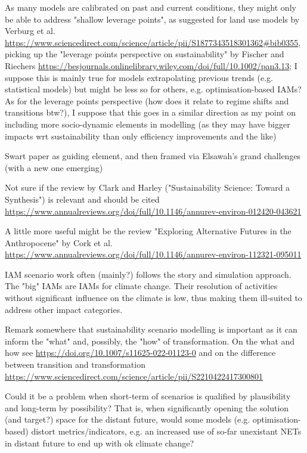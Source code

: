 \documentclass{article}
\begin{document}
As many models are calibrated on past and current conditions, they might only be able to address "shallow leverage points", as suggested for land use models by Verburg et al. \url{https://www.sciencedirect.com/science/article/pii/S1877343518301362#bib0355}, picking up the "leverage points perspective on sustainability" by Fischer and Riechers \url{https://besjournals.onlinelibrary.wiley.com/doi/full/10.1002/pan3.13}; I suppose this is mainly true for models extrapolating previous trends (e.g. statistical models) but might be less so for others, e.g. optimisation-based IAMs? As for the leverage points perspective (how does it relate to regime shifts and transitions btw?), I suppose that this goes in a similar direction as my point on including more socio-dynamic elements in modelling (as they may have bigger impacts wrt sustainability than only efficiency improvements and the like)

Swart paper as guiding element, and then framed via Elsawah's grand challenges (with a new one emerging)

Not sure if the review by Clark and Harley ("Sustainability Science: Toward a Synthesis") is relevant and should be cited \url{https://www.annualreviews.org/doi/full/10.1146/annurev-environ-012420-043621}

A little more useful might be the review "Exploring Alternative Futures in the Anthropocene" by Cork et al. \url{https://www.annualreviews.org/doi/full/10.1146/annurev-environ-112321-095011}

IAM scenario work often (mainly?) follows the story and simulation approach.
The "big" IAMs are IAMs for climate change. Their resolution of activities without significant influence on the climate is low, thus making them ill-suited to address other impact categories.

Remark somewhere that sustainability scenario modelling is important as it can inform the "what" and, possibly, the "how" of transformation. On the what and how see \url{https://doi.org/10.1007/s11625-022-01123-0} and on the difference between transition and transformation \url{https://www.sciencedirect.com/science/article/pii/S2210422417300801}

Could it be a problem when short-term of scenarios is qualified by plausibility and long-term by possibility? That is, when significantly opening the solution (and target?) space for the distant future, would some models (e.g. optimisation-based) distort metrics/indicators, e.g. an increased use of so-far unexistant NETs in distant future to end up with ok climate change?
\end{document}
